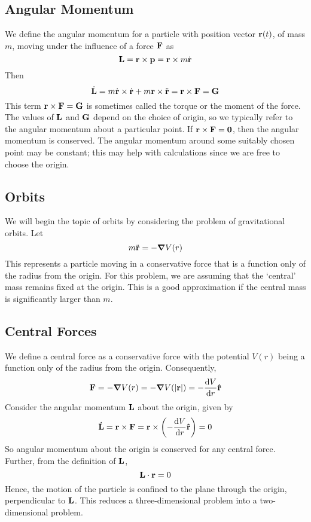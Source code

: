 \subsection{Angular Momentum}
We define the angular momentum for a particle with position vector \(\vb r(t)\), of mass \(m\), moving under the influence of a force \(\vb F\) as
\[
	\vb L = \vb r \times \vb p = \vb r \times m \dot{\vb r}
\]
Then
\[
	\dot{\vb L} = m\dot{\vb r} \times \dot{\vb r} + m\vb r \times \ddot{\vb r} = \vb r \times \vb F = \vb G
\]
This term \(\vb r \times \vb F = \vb G\) is sometimes called the torque or the moment of the force.
The values of \(\vb L\) and \(\vb G\) depend on the choice of origin, so we typically refer to the angular momentum about a particular point.
If \(\vb r \times \vb F = \vb 0\), then the angular momentum is conserved.
The angular momentum around some suitably chosen point may be constant; this may help with calculations since we are free to choose the origin.

\subsection{Orbits}
We will begin the topic of orbits by considering the problem of gravitational orbits.
Let
\[
	m\ddot{\vb r} = -\grad V(r)
\]
This represents a particle moving in a conservative force that is a function only of the radius from the origin.
For this problem, we are assuming that the `central' mass remains fixed at the origin.
This is a good approximation if the central mass is significantly larger than \(m\).

\subsection{Central Forces}
We define a central force as a conservative force with the potential \(V(r)\) being a function only of the radius from the origin.
Consequently,
\[
	\vb F = -\grad V(r) = -\grad V(\abs{\vb r}) = -\frac{\dd{V}}{\dd{r}}\vu{r}
\]
Consider the angular momentum \(\vb L\) about the origin, given by
\[
	\dot{\vb L} = \vb r \times \vb F = \vb r \times \left(-\frac{\dd{V}}{\dd{r}}\vu{r}\right) = 0
\]
So angular momentum about the origin is conserved for any central force.
Further, from the definition of \(\vb L\),
\[
	\vb L \cdot \vb r = 0
\]
Hence, the motion of the particle is confined to the plane through the origin, perpendicular to \(\vb L\).
This reduces a three-dimensional problem into a two-dimensional problem.

